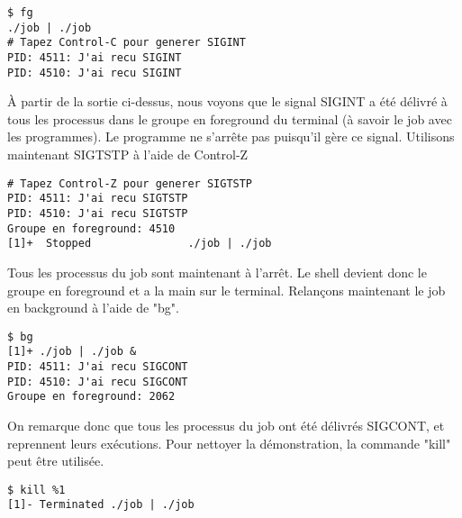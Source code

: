 \begin{lstlisting}[style=blackstyle]
$ fg
./job | ./job
# Tapez Control-C pour generer SIGINT
PID: 4511: J'ai recu SIGINT
PID: 4510: J'ai recu SIGINT
\end{lstlisting}

À partir de la sortie ci-dessus, nous voyons que le signal SIGINT a été délivré à tous les
processus dans le groupe en foreground du terminal (à savoir le job avec les programmes).
Le programme ne s'arrête pas puisqu'il gère ce signal.
\newline
Utilisons maintenant SIGTSTP à l'aide de Control-Z

\begin{lstlisting}[style=blackstyle]
# Tapez Control-Z pour generer SIGTSTP
PID: 4511: J'ai recu SIGTSTP
PID: 4510: J'ai recu SIGTSTP
Groupe en foreground: 4510
[1]+  Stopped             	./job | ./job
\end{lstlisting}

Tous les processus du job sont maintenant à l'arrêt. Le shell devient donc le groupe en foreground et a la main
sur le terminal.
\newline
Relançons maintenant le job en background à l'aide de "bg".

\begin{lstlisting}[style=blackstyle]
$ bg
[1]+ ./job | ./job &
PID: 4511: J'ai recu SIGCONT
PID: 4510: J'ai recu SIGCONT
Groupe en foreground: 2062
\end{lstlisting}

On remarque donc que tous les processus du job ont été délivrés SIGCONT, et reprennent leurs exécutions.
\newline
Pour nettoyer la démonstration, la commande "kill" peut être utilisée.
\begin{lstlisting}[style=blackstyle]
$ kill %1
[1]- Terminated ./job | ./job
\end{lstlisting}





